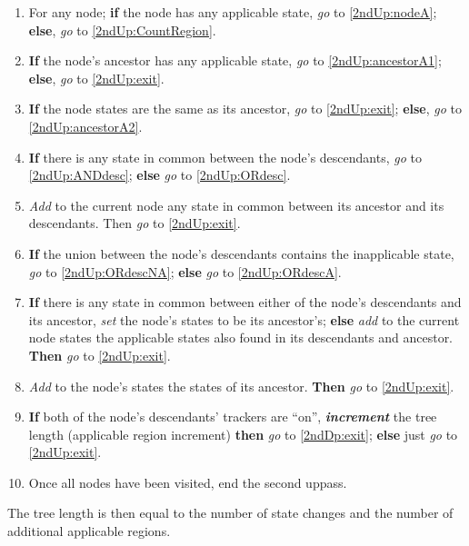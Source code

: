 \documentclass[a4paper,12pt]{article}
\begin{document}
\begin{enumerate}
    \item \label{2ndUp:enter} For any node; \textbf{if} the node has any applicable state, \textit{go} to \ref{2ndUp:nodeA}; \textbf{else}, \textit{go} to \ref{2ndUp:CountRegion}.
    \item \label{2ndUp:nodeA} \textbf{If} the node's ancestor has any applicable state, \textit{go} to \ref{2ndUp:ancestorA1}; \textbf{else}, \textit{go} to \ref{2ndUp:exit}.
    \item \label{2ndUp:ancestorA1} \textbf{If} the node states are the same as its ancestor, \textit{go} to \ref{2ndUp:exit}; \textbf{else}, \textit{go} to \ref{2ndUp:ancestorA2}.
    \item \label{2ndUp:ancestorA2} \textbf{If} there is any state in common between the node's descendants, \textit{go} to \ref{2ndUp:ANDdesc}; \textbf{else} \textit{go} to \ref{2ndUp:ORdesc}.
    \item \label{2ndUp:ANDdesc} \textit{Add} to the current node any state in common between its ancestor and its descendants. Then \textit{go} to \ref{2ndUp:exit}.
    \item \label{2ndUp:ORdesc} \textbf{If} the union between the node's descendants contains the inapplicable state, \textit{go} to \ref{2ndUp:ORdescNA}; \textbf{else} \textit{go} to \ref{2ndUp:ORdescA}.
    \item \label{2ndUp:ORdescNA} \textbf{If} there is any state in common between either of the node's descendants and its ancestor, \textit{set} the node's states to be its ancestor's; \textbf{else} \textit{add} to the current node states the applicable states also found in its descendants and ancestor. \textbf{Then} \textit{go} to \ref{2ndUp:exit}.
    \item \label{2ndUp:ORdescA} \textit{Add} to the node's states the states of its ancestor. \textbf{Then} \textit{go} to \ref{2ndUp:exit}.
    \item \label{2ndUp:CountRegion} \textbf{If} both of the node's descendants' trackers are ``on'', \textbf{\textit{increment}} the tree length (applicable region increment) \textbf{then} \textit{go} to \ref{2ndDp:exit}; \textbf{else} just \textit{go} to \ref{2ndUp:exit}.
    \item \label{2ndUp:exit} Once all nodes have been visited, end the second uppass.
\end{enumerate}

The tree length is then equal to the number of state changes and the number of additional applicable regions.
\end{document}
